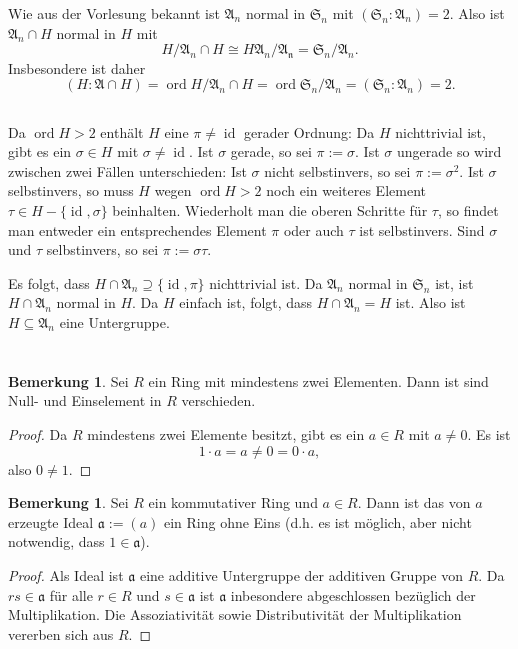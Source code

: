 \documentclass[a4paper,10pt]{article}
\theoremstyle{definition}
\newtheorem{bem}[beh]{Bemerkung}
\newcommand{\Sn}{\mathfrak{S}}
\newcommand{\mf}[1]{\mathfrak{#1}}
\newcommand{\id}{\operatorname{id}}
\newcommand{\ord}{\operatorname{ord}}
\begin{document}
Wie aus der Vorlesung bekannt ist $\mf{A}_n$ normal in $\Sn_n$ mit $(\Sn_n : \mf{A}_n) = 2$. Also ist $\mf{A}_n \cap H$ normal in $H$ mit
\[
 H / \mf{A}_n \cap H \cong H\mf{A}_n / \mf{A_n} = \Sn_n / \mf{A}_n.
\]
Insbesondere ist daher
\[
 (H : \mf{A} \cap H) = \ord H / \mf{A}_n \cap H = \ord \Sn_n / \mf{A}_n = (\Sn_n : \mf{A}_n) = 2.
\]


\subsection{}
Da $\ord H > 2$ enthält $H$ eine $\pi \neq \id$ gerader Ordnung: Da $H$ nichttrivial ist, gibt es ein $\sigma \in H$ mit $\sigma \neq \id$. Ist $\sigma$ gerade, so sei $\pi := \sigma$. Ist $\sigma$ ungerade so wird zwischen zwei Fällen unterschieden: Ist $\sigma$ nicht selbstinvers, so sei $\pi := \sigma^2$. Ist $\sigma$ selbstinvers, so muss $H$ wegen $\ord H > 2$ noch ein weiteres Element $\tau \in H-\{\id,\sigma\}$ beinhalten. Wiederholt man die oberen Schritte für $\tau$, so findet man entweder ein entsprechendes Element $\pi$ oder auch $\tau$ ist selbstinvers. Sind $\sigma$ und $\tau$ selbstinvers, so sei $\pi := \sigma \tau$.

Es folgt, dass $H \cap \mf{A}_n \supseteq \{\id, \pi\}$ nichttrivial ist. Da $\mf{A}_n$ normal in $\Sn_n$ ist, ist $H \cap \mf{A}_n$ normal in $H$. Da $H$ einfach ist, folgt, dass $H \cap \mf{A}_n = H$ ist. Also ist $H \subseteq \mf{A}_n$ eine Untergruppe.








\section{}

\begin{bem}\label{bem: 0 neq 1}
 Sei $R$ ein Ring mit mindestens zwei Elementen. Dann ist sind Null- und Einselement in $R$ verschieden.
\end{bem}
\begin{proof}
 Da $R$ mindestens zwei Elemente besitzt, gibt es ein $a \in R$ mit $a \neq 0$. Es ist
 \[
  1 \cdot a = a \neq 0 = 0 \cdot a,
 \]
 also $0 \neq 1$.
\end{proof}

\begin{bem}\label{bem: ideal ring ohne null}
 Sei $R$ ein kommutativer Ring und $a \in R$. Dann ist das von $a$ erzeugte Ideal $\mf{a} := (a)$ ein Ring ohne Eins (d.h. es ist möglich, aber nicht notwendig, dass $1 \in \mf{a}$).
\end{bem}
\begin{proof}
 Als Ideal ist $\mf{a}$ eine additive Untergruppe der additiven Gruppe von $R$. Da $rs \in \mf{a}$ für alle $r \in R$ und $s \in \mf{a}$ ist $\mf{a}$ inbesondere abgeschlossen bezüglich der Multiplikation. Die Assoziativität sowie Distributivität der Multiplikation vererben sich aus $R$.
\end{proof}
\end{document}
